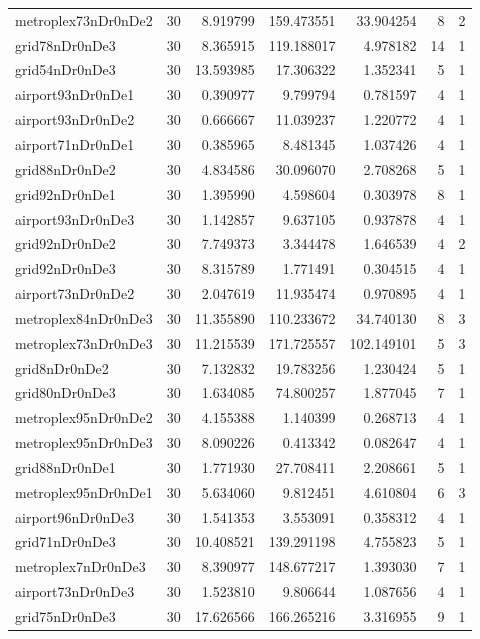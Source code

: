 \begin{longtable}{|l|r|r|r|r|r|r|}
metroplex73nDr0nDe2 & 30 & 8.919799 & 159.473551 & 33.904254 & 8 & 2 \\
grid78nDr0nDe3 & 30 & 8.365915 & 119.188017 & 4.978182 & 14 & 1 \\
grid54nDr0nDe3 & 30 & 13.593985 & 17.306322 & 1.352341 & 5 & 1 \\
airport93nDr0nDe1 & 30 & 0.390977 & 9.799794 & 0.781597 & 4 & 1 \\
airport93nDr0nDe2 & 30 & 0.666667 & 11.039237 & 1.220772 & 4 & 1 \\
airport71nDr0nDe1 & 30 & 0.385965 & 8.481345 & 1.037426 & 4 & 1 \\
grid88nDr0nDe2 & 30 & 4.834586 & 30.096070 & 2.708268 & 5 & 1 \\
grid92nDr0nDe1 & 30 & 1.395990 & 4.598604 & 0.303978 & 8 & 1 \\
airport93nDr0nDe3 & 30 & 1.142857 & 9.637105 & 0.937878 & 4 & 1 \\
grid92nDr0nDe2 & 30 & 7.749373 & 3.344478 & 1.646539 & 4 & 2 \\
grid92nDr0nDe3 & 30 & 8.315789 & 1.771491 & 0.304515 & 4 & 1 \\
airport73nDr0nDe2 & 30 & 2.047619 & 11.935474 & 0.970895 & 4 & 1 \\
metroplex84nDr0nDe3 & 30 & 11.355890 & 110.233672 & 34.740130 & 8 & 3 \\
metroplex73nDr0nDe3 & 30 & 11.215539 & 171.725557 & 102.149101 & 5 & 3 \\
grid8nDr0nDe2 & 30 & 7.132832 & 19.783256 & 1.230424 & 5 & 1 \\
grid80nDr0nDe3 & 30 & 1.634085 & 74.800257 & 1.877045 & 7 & 1 \\
metroplex95nDr0nDe2 & 30 & 4.155388 & 1.140399 & 0.268713 & 4 & 1 \\
metroplex95nDr0nDe3 & 30 & 8.090226 & 0.413342 & 0.082647 & 4 & 1 \\
grid88nDr0nDe1 & 30 & 1.771930 & 27.708411 & 2.208661 & 5 & 1 \\
metroplex95nDr0nDe1 & 30 & 5.634060 & 9.812451 & 4.610804 & 6 & 3 \\
airport96nDr0nDe3 & 30 & 1.541353 & 3.553091 & 0.358312 & 4 & 1 \\
grid71nDr0nDe3 & 30 & 10.408521 & 139.291198 & 4.755823 & 5 & 1 \\
metroplex7nDr0nDe3 & 30 & 8.390977 & 148.677217 & 1.393030 & 7 & 1 \\
airport73nDr0nDe3 & 30 & 1.523810 & 9.806644 & 1.087656 & 4 & 1 \\
grid75nDr0nDe3 & 30 & 17.626566 & 166.265216 & 3.316955 & 9 & 1 \\

\end{longtable}
